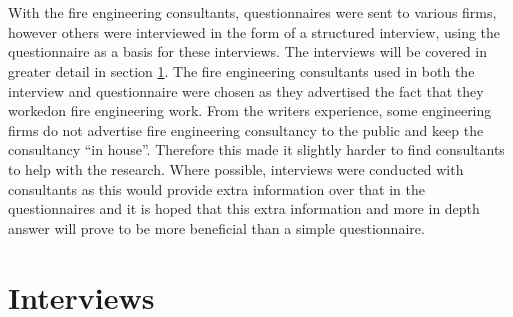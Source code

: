 \documentclass[a4paper,oneside]{report}
\begin{document}
\\
\\
With the fire engineering consultants, questionnaires were sent to various firms, however others were interviewed in the form of a structured interview, using the questionnaire as a basis for these interviews. The interviews will be covered in greater detail in section \ref{sec:Interviews}. The fire engineering consultants used in both the interview and questionnaire were chosen as they advertised the fact that they workedon fire engineering work. From the writers experience, some engineering firms do not advertise fire engineering consultancy to the public and keep the consultancy ``in house''. Therefore this made it slightly harder to find consultants to help with the research. Where possible, interviews were conducted with consultants as this would provide extra information over that in the questionnaires and it is hoped that this extra information and more in depth answer will prove to be more beneficial than a simple questionnaire.
\\
\section{Interviews}
\label{sec:Interviews}
\end{document}
